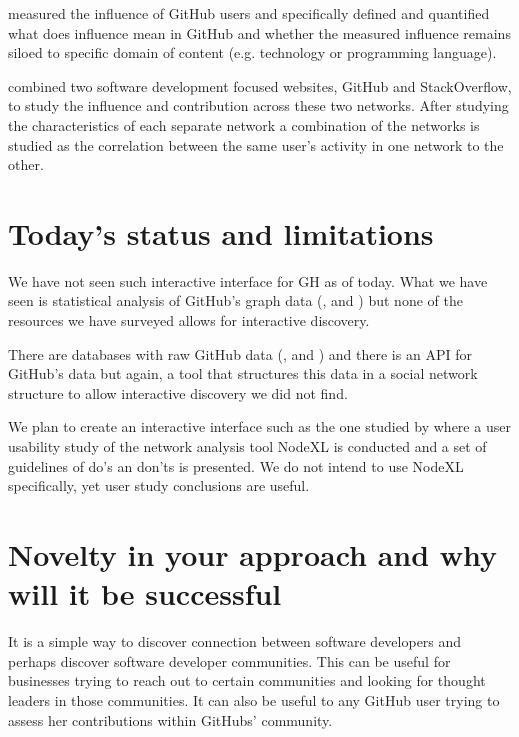 \documentclass[sigconf,11pt]{acmart}
\begin{document}
\citeauthor{measuring-user-influence-github}\cite{measuring-user-influence-github} measured the influence
of GitHub users and specifically defined and quantified what does influence mean in GitHub and whether the measured
influence remains siloed to specific domain of content (e.g. technology or programming language).

\citeauthor{influence-github-stackoverflow}\cite{influence-github-stackoverflow} combined two software development
focused websites, GitHub and StackOverflow, to study the influence and contribution across these two networks.
After studying the characteristics of each separate network a combination of the networks is studied
as the correlation between the same user's activity in one network to the other.


\section*{Today's status and limitations}
We have not seen such interactive interface for GH as of today.
What we have seen is statistical analysis of GitHub's graph data (\cite{coding-together},
\cite{influence-analysis-of-github-repositories} and \cite{collaboration-strength-metrics-github})
but none of the resources we have surveyed allows for interactive discovery.

There are databases with raw GitHub data (\cite{ghtorrent}, \cite{gharchive} and \cite{bq-gh})
and there is an API for GitHub's data\cite{gh-api} but again, a tool that structures this data
in a social network structure to allow interactive discovery we did not find.

We plan to create an interactive interface such as the one studied by \citeauthor{do-you-know-the-way-to-sna}\cite{do-you-know-the-way-to-sna}
where a user usability study of the network analysis tool NodeXL is conducted and a set of guidelines of do's an don'ts is presented.
We do not intend to use NodeXL specifically, yet user study conclusions are useful.

\section*{Novelty in your approach and why will it be successful}
It is a simple way to discover connection between software developers and perhaps discover software developer communities.
This can be useful for businesses trying to reach out to certain communities and looking for thought leaders in those communities.
It can also be useful to any GitHub user trying to assess her contributions within GitHubs' community.
\end{document}
